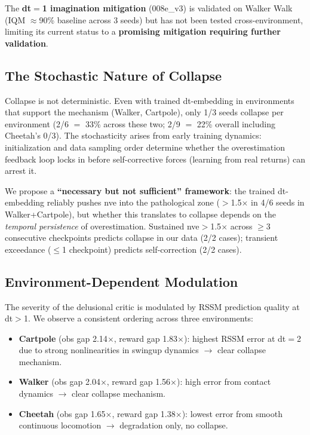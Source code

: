 \documentclass[letterpaper]{article}
\begin{document}
The \textbf{dt$=$1 imagination mitigation} (008e\_v3) is validated on Walker Walk (IQM $\approx$90\% baseline across 3 seeds) but has not been tested cross-environment, limiting its current status to a \textbf{promising mitigation requiring further validation}.

\subsection{The Stochastic Nature of Collapse}

Collapse is not deterministic.
Even with trained dt-embedding in environments that support the mechanism (Walker, Cartpole), only 1/3 seeds collapse per environment (2/6 $=$ 33\% across these two; 2/9 $=$ 22\% overall including Cheetah's 0/3).
The stochasticity arises from early training dynamics: initialization and data sampling order determine whether the overestimation feedback loop locks in before self-corrective forces (learning from real returns) can arrest it.

We propose a \textbf{``necessary but not sufficient'' framework}: the trained dt-embedding reliably pushes nve into the pathological zone ($>$1.5$\times$ in 4/6 seeds in Walker+Cartpole), but whether this translates to collapse depends on the \emph{temporal persistence} of overestimation.
Sustained nve$>$1.5$\times$ across $\geq$3 consecutive checkpoints predicts collapse in our data (2/2 cases); transient exceedance ($\leq$1 checkpoint) predicts self-correction (2/2 cases).

\subsection{Environment-Dependent Modulation}

The severity of the delusional critic is modulated by RSSM prediction quality at dt$>$1.
We observe a consistent ordering across three environments:

\begin{itemize}
    \item \textbf{Cartpole} (obs gap 2.14$\times$, reward gap 1.83$\times$): highest RSSM error at dt$=$2 due to strong nonlinearities in swingup dynamics $\to$ clear collapse mechanism.
    \item \textbf{Walker} (obs gap 2.04$\times$, reward gap 1.56$\times$): high error from contact dynamics $\to$ clear collapse mechanism.
    \item \textbf{Cheetah} (obs gap 1.65$\times$, reward gap 1.38$\times$): lowest error from smooth continuous locomotion $\to$ degradation only, no collapse.
\end{itemize}
\end{document}

